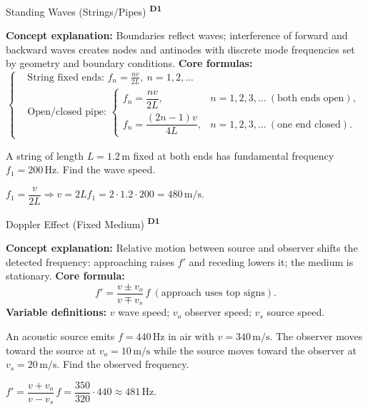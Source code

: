 ﻿\documentclass[12pt,a4paper]{article}
\providecommand{\KPFormulas}{}
\providecommand{\KPProblems}{}
\newcommand{\DOne}{\texorpdfstring{\textsuperscript{\textbf{D1}}}{ D1}}
\begin{document}
\begin{KnowledgePoint}{Standing Waves (Strings/Pipes) \DOne}
  \KPFormulas
  \begin{formulabox}
  \textbf{Concept explanation:} Boundaries reflect waves; interference of forward and backward waves creates nodes and antinodes with discrete mode frequencies set by geometry and boundary conditions.
  \textbf{Core formulas:}
  \[
  \left\{\begin{aligned}
    &\text{String fixed ends: } f_n=\frac{nv}{2L},\ n=1,2,\dots\\
    &\text{Open/closed pipe: }\begin{cases}
      f_n=\dfrac{nv}{2L}, & n=1,2,3,\dots\ (\text{both ends open}),\\
      f_n=\dfrac{(2n-1)v}{4L}, & n=1,2,3,\dots\ (\text{one end closed}).
    \end{cases}
  \end{aligned}\right.
  \]
  \end{formulabox}

  \KPProblems
  \begin{cheatproblem}
  A string of length $L=1.2\,\text{m}$ fixed at both ends has fundamental frequency $f_1=200\,\text{Hz}$. Find the wave speed.
  \begin{solutionbox}
  $f_1=\dfrac{v}{2L}\Rightarrow v=2Lf_1=2\cdot1.2\cdot200=480\,\text{m/s}$.
  \end{solutionbox}
  \end{cheatproblem}
\end{KnowledgePoint}

\begin{KnowledgePoint}{Doppler Effect (Fixed Medium) \DOne}
  \KPFormulas
  \begin{formulabox}
  \textbf{Concept explanation:} Relative motion between source and observer shifts the detected frequency: approaching raises $f'$ and receding lowers it; the medium is stationary.
  \textbf{Core formula:}
  \[
    f'=\frac{v\pm v_o}{v\mp v_s}\,f\ (\text{approach uses top signs}).
  \]
  \textbf{Variable definitions:} $v$ wave speed; $v_o$ observer speed; $v_s$ source speed.
  \end{formulabox}

  \KPProblems
  \begin{cheatproblem}
  An acoustic source emits $f=440\,\text{Hz}$ in air with $v=340\,\text{m/s}$. The observer moves toward the source at $v_o=10\,\text{m/s}$ while the source moves toward the observer at $v_s=20\,\text{m/s}$. Find the observed frequency.
  \begin{solutionbox}
  $f'=\dfrac{v+v_o}{v-v_s}\,f=\dfrac{350}{320}\cdot 440\approx 481\,\text{Hz}$.
  \end{solutionbox}
  \end{cheatproblem}
\end{KnowledgePoint}
\end{document}
